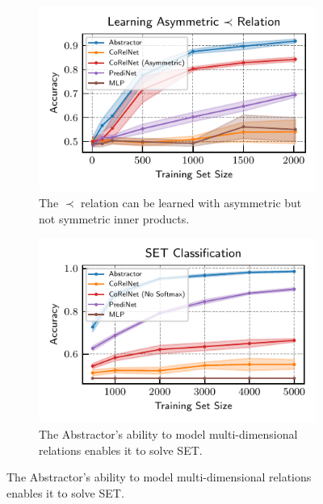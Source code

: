 \begin{figure}[t]
    \centering
    \begin{subfigure}[t]{0.32\textwidth}
        \centering
        \vskip-20pt
        \includegraphics[width=\textwidth]{figures/experiments/pairwise_order_learning_curves.pdf}
        \vskip-5pt
        \caption{The $\prec$ relation can be learned with asymmetric but not symmetric inner products.}\label{fig:exp_order_relation}
    \end{subfigure}
    \begin{subfigure}[t]{0.32\textwidth}
        \centering
        \vskip-20pt
        \includegraphics[width=\textwidth]{figures/experiments/set_classification.pdf}
        \vskip-5pt
        \caption{The Abstractor's ability to model multi-dimensional relations enables it to solve SET.}\label{fig:exp_set_classification}

\end{subfigure}
\end{figure}
